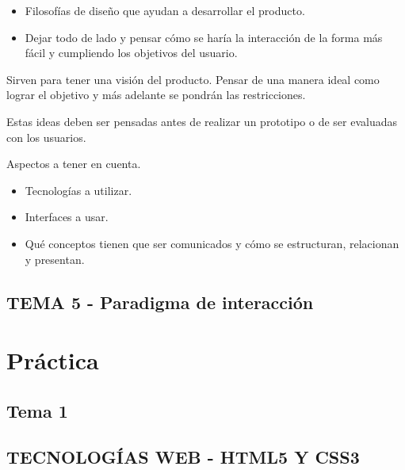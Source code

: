 \documentclass[12pt, twoside, openright]{report} %
\begin{document}
\begin{itemize}
      \begin{itemize}
      
      \item
        Filosofías de diseño que ayudan a desarrollar el producto.
      \item
        Dejar todo de lado y pensar cómo se haría la interacción de la
        forma más fácil y cumpliendo los objetivos del usuario.
      \end{itemize}
    \end{itemize}

    Sirven para tener una visión del producto. Pensar de una manera
    ideal como lograr el objetivo y más adelante se pondrán las
    restricciones.

    Estas ideas deben ser pensadas antes de realizar un prototipo o de
    ser evaluadas con los usuarios.

    Aspectos a tener en cuenta.

    \begin{itemize}
    
    \item
      Tecnologías a utilizar.
    \item
      Interfaces a usar.
    \item
      Qué conceptos tienen que ser comunicados y cómo se estructuran,
      relacionan y presentan.
    \end{itemize}

\chapter{TEMA 5 - Paradigma de interacción}



\part{Práctica}


\chapter{Tema 1}

  

  

\chapter{TECNOLOGÍAS WEB - HTML5 Y CSS3}
\end{document}
